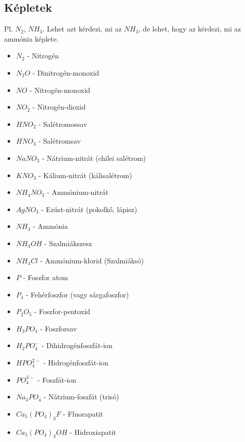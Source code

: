 \documentclass{article}
\begin{document}
\subsection{Képletek}
Pl. $N_2$, $NH_3$. Lehet azt kérdezi, mi az $NH_3$, de lehet, hogy az kérdezi, mi az ammónia képlete.
\begin{itemize}
    \item $N_2$ - Nitrogén
    \item $N_2O$ - Dinitrogén-monoxid
    \item $NO$ - Nitrogén-monoxid
    \item $NO_2$ - Nitrogén-dioxid
    \item $HNO_2$ - Salétromossav
    \item $HNO_3$ - Salétromsav
    \item $NaNO_3$ - Nátrium-nitrát (chilei salétrom)
    \item $KNO_3$ - Kálium-nitrát (kálisalétrom)
    \item $NH_4NO_3$ - Ammónium-nitrát
    \item $AgNO_3$ - Ezüst-nitrát (pokolkő, lápisz)
    \item $NH_3$ - Ammónia
    \item $NH_4OH$ - Szalmiákszesz
    \item $NH_4Cl$ - Ammónium-klorid (Szalmiáksó)
    \item $P$ - Foszfor atom
    \item $P_4$ - Fehérfoszfor (vagy sárgafoszfor)
    \item $P_2O_5$ - Foszfor-pentoxid
    \item $H_3PO_4$ - Foszforsav
    \item $H_2PO_4^-$ - Dihidrogénfoszfát-ion
    \item $HPO_4^{2-}$ - Hidrogénfoszfát-ion
    \item $PO_4^{3-}$ - Foszfát-ion
    \item $Na_3PO_4$ - Nátrium-foszfát (trisó)
    \item $Ca_5(PO_4)_3F$ - Fluorapatit
    \item $Ca_5(PO_4)_3OH$ - Hidroxiapatit
    
\end{itemize}
\end{document}
